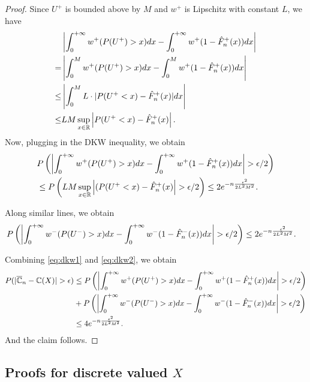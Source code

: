 \begin{proof}
Since $U^+$ is bounded above by $M$ and $w^+$ is Lipschitz with constant $L$, we have
\begin{align*}
&\left|\int_0^{+\infty} w^+(P(U^+)>x) dx- \int_0^{+\infty} w^+(1- {\hat F_n}^+(x)) dx\right|
\\
= & \left|\int_0^M w^+(P(U^+)>x) dx- \int_0^M w^+(1- {\hat F_n}^+(x)) dx\right|
\\
\leq&
\left|\int_0^M L\cdot |P(U^+<x)-{\hat F_n}^+(x)| dx\right|\\
\leq&
LM\sup_{x\in \mathbb{R}}\left|P(U^+<x)-{\hat F_n}^+(x)\right|.
\end{align*}
Now, plugging in the DKW inequality, we obtain
\begin{align}
&
P\left(\left|\intinfinity w^+(P(U^+)>x) dx- \intinfinity w^+(1- {\hat F_n}^+(x)) dx\right|>\epsilon/2\right)
\nonumber\\
&
\leq
 P\left(LM\sup_{x\in \mathbb{R}} \left|(P(U^+<x)-{\hat F_n}^+(x)\right|>\epsilon/2\right) \leq 2 e^{-n \frac{\epsilon^2}{2 L^2 M^2}}.\label{eq:dkw1}
\end{align}

Along similar lines, we obtain
\begin{align}
&
P\left(\left|\intinfinity w^-(P(U^-)>x) dx- \intinfinity w^-(1- {\hat F_n}^-(x)) dx\right|>\epsilon/2\right)
 \leq 2 e^{-n \frac{\epsilon^2}{2 L^2 M^2}}.\label{eq:dkw2}
\end{align}

Combining \eqref{eq:dkw1} and \eqref{eq:dkw2}, we obtain
\begin{align*}
P(|\overline \C_n - \C(X)|>\epsilon) 
&\le P\left(\left|\intinfinity w^+(P(U^+)>x) dx- \intinfinity w^+(1- {\hat F_n}^+(x)) dx\right|>\epsilon/2\right) \\
&+ 
P\left(\left|\intinfinity w^-(P(U^-)>x) dx- \intinfinity w^-(1- {\hat F_n}^-(x)) dx\right|>\epsilon/2\right)\\
&\le 4 e^{-n \frac{\epsilon^2}{2 L^2 M^2}}.
\end{align*} 
And the claim follows. 
\end{proof}

\subsection{Proofs for discrete valued $X$}
\label{sec:proofs-discrete}


